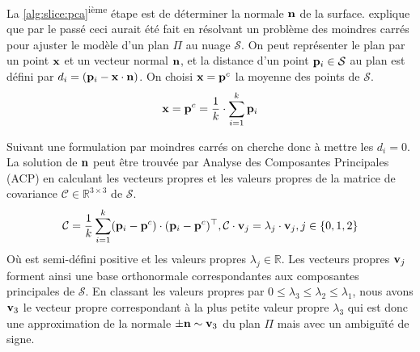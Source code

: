 La \ref{alg:slice:pca}\textsuperscript{ième} étape est de déterminer la normale $\mathbf{n}$ de la surface. \citep{Rusu2009} explique que par le passé ceci aurait été fait en résolvant un problème des moindres carrés pour ajuster le modèle d'un plan $\Pi$ au nuage $\mathcal{S}$. On peut représenter le plan par un point $\mathbf{x}$ et un vecteur normal $\mathbf{n}$, et la distance d'un point $\mathbf{p}_i \in \mathcal{S}$ au plan est défini par $d_i = (\mathbf{p}_i - \mathbf{x} \cdot \mathbf{n})$. On choisi $\mathbf{x} = \mathbf{p}^c$ la moyenne des points de $\mathcal{S}$.
\begin{align}
  \mathbf{x} = \mathbf{p}^c = \frac{1}{k} \cdot \sum^{k}_{i=1} \mathbf{p}_i
\end{align}

Suivant une formulation par moindres carrés on cherche donc à mettre les $d_i = 0$. La solution de $\mathbf{n}$ peut être trouvée par Analyse des Composantes Principales (ACP) en calculant les vecteurs propres et les valeurs propres de la matrice de covariance $\mathcal{C} \in \mathbb{R}^{3\times 3}$ de $\mathcal{S}$.
\begin{align}
  \mathcal{C} = \frac{1}{k} \sum^{k}_{i=1} (\mathbf{p}_i - \mathbf{p}^c) \cdot (\mathbf{p}_i - \mathbf{p}^c)^\top, \mathcal{C} \cdot \mathbf{v}_j = \lambda_j \cdot \mathbf{v}_j, j \in \{0, 1, 2\}
\end{align}
Où  est semi-défini positive et les valeurs propres $\lambda_j \in \mathbb{R}$. Les vecteurs propres $\mathbf{v}_j$ forment ainsi une base orthonormale correspondantes aux composantes principales de $\mathcal{S}$. En classant les valeurs propres par $0 \leq \lambda_3 \leq \lambda_2 \leq \lambda_1$, nous avons $\mathbf{v}_3$ le vecteur propre correspondant à la plus petite valeur propre $\lambda_3$ qui est donc une approximation de la normale $\pm \mathbf{n} \sim \mathbf{v}_{3}$ du plan $\Pi$ mais avec un ambiguïté de signe.

